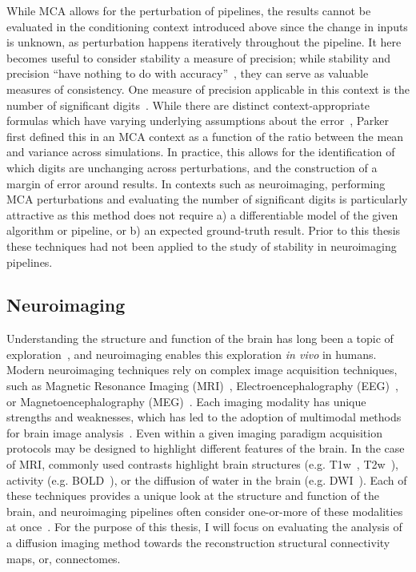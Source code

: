 While MCA allows for the perturbation of pipelines, the results cannot be evaluated in the conditioning context
introduced above since the change in inputs is unknown, as perturbation happens iteratively throughout the pipeline. It
here becomes useful to consider stability a measure of precision; while stability and precision ``have nothing to do
with accuracy''~\cite{kiusalaas2013numerical}, they can serve as valuable measures of consistency. One measure of
precision applicable in this context is the number of significant digits~\cite{Parker1997-qq}. While there are distinct
context-appropriate formulas which have varying underlying assumptions about the error~\cite{sohier2018confidence},
Parker~\cite{Parker1997-qq} first defined this in an MCA context as a function of the ratio between the mean and
variance across simulations. In practice, this allows for the identification of which digits are unchanging across
perturbations, and the construction of a margin of error around results. In contexts such as neuroimaging, performing
MCA perturbations and evaluating the number of significant digits is particularly attractive as this method does not
require a) a differentiable model of the given algorithm or pipeline, or b) an expected ground-truth result. Prior to
this thesis these techniques had not been applied to the study of stability in neuroimaging pipelines.


\subsection{Neuroimaging}
Understanding the structure and function of the brain has long been a topic of exploration~\cite{raichle2006brain}, and
neuroimaging enables this exploration \textit{in vivo} in humans. Modern neuroimaging techniques rely on complex image
acquisition techniques, such as Magnetic Resonance Imaging (MRI)~\cite{young1987magnetic}, Electroencephalography
(EEG)~\cite{da2009eeg}, or Magnetoencephalography (MEG)~\cite{baillet2017magnetoencephalography}. Each imaging modality
has unique strengths and weaknesses, which has led to the adoption of multimodal methods for brain image
analysis~\cite{sui2012review,calhoun2006feature}. Even within a given imaging paradigm acquisition protocols may be
designed to highlight different features of the brain. In the case of MRI, commonly used contrasts highlight brain
structures (e.g. T1w~\cite{bergamino2014review}, T2w~\cite{chavhan2009principles}), activity (e.g.
BOLD~\cite{logothetis2004nature}), or the diffusion of water in the brain (e.g. DWI~\cite{bammer2003basic}). Each of
these techniques provides a unique look at the structure and function of the brain, and neuroimaging pipelines often
consider one-or-more of these modalities at once~\cite{esteban2019fmriprep,garyfallidis2014dipy}. For the purpose of
this thesis, I will focus on evaluating the analysis of a diffusion imaging method towards the reconstruction structural
connectivity maps, or, connectomes.

